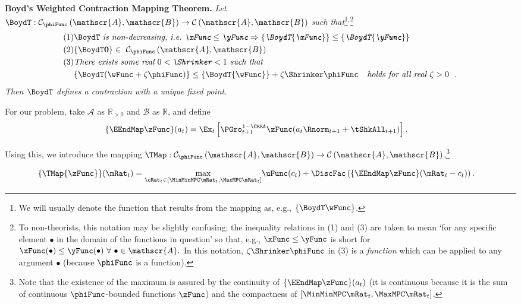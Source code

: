\documentclass[BufferStockTheory]{subfiles}
\begin{document}
\textbf{Boyd's Weighted Contraction Mapping Theorem.} \textit{Let $\BoydT:\mathcal{C}_{\phiFunc }\left( \mathscr{A},\mathscr{B}\right)
  \rightarrow \mathcal{C}\left( \mathscr{A},\mathscr{B}\right) $ such
  that}\footnote{We will usually denote the function that results from the mapping as, e.g., $\{\BoydT\wFunc\}$.}$^,$\footnote{To non-theorists, this notation may be slightly confusing; the inequality relations in (1) and (3) are taken to mean `for any specific element $\bullet$ in the domain of the functions in question' so that, e.g., $\xFunc \leq \yFunc$ is short for $\xFunc(\bullet) \leq \yFunc(\bullet)~\forall~\bullet\in \mathscr{A}.$  In this notation, $\zeta \Shrinker \phiFunc$ in (3) is a \textit{function} which can be applied to any argument $\bullet$ (because $\phiFunc$ is a function).} \nopagebreak
\begin{align*}
  \mbox{(1)} &\BoydT%
               \mbox{ \textit{is non-decreasing, i.e.\ ${\xFunc} \leq {\yFunc}\Rightarrow
               \{\BoydT{\xFunc}\} \leq \{\BoydT{\yFunc}\}$}}   \nonumber \\
  \mbox{(2)} & \{\BoydT\mathbf{0}\}\in ~ \mathcal{C}_{\phiFunc }\left(\mathscr{A},\mathscr{B}\right)  \notag \\
  \mbox{(3)}
             & \mbox{\textit{There exists some real $0 < \Shrinker < 1$ such that}} \\
             & \{\BoydT({\wFunc} +\zeta\phiFunc )\} \leq \{\BoydT{\wFunc}\} +\zeta\Shrinker \phiFunc 
               \mbox{ \textit{ ~holds for all real $\zeta > 0$ } } .
\end{align*}
\textit{Then $\BoydT$ defines a contraction with a unique fixed point.}

For our problem, take $\mathscr{A}$ as $\mathbb{R}_{>0}$ and $\mathscr{B}$
as $\mathbb{R}$, and define
\begin{align*}
  \{\EEndMap \zFunc\}(a_{t})  & = \Ex_{t}\left[\PGro^{1-\CRRA}_{t+1} \zFunc(a_{t} \Rnorm_{t+1} + \tShkAll_{t+1})\right].
\end{align*}

Using this, we introduce the mapping \textit{$\TMap:\mathcal{C}_{\phiFunc }\left( \mathscr{A},\mathscr{B}\right) \rightarrow \mathcal{C}\left(
    \mathscr{A},\mathscr{B}\right) $},\footnote{Note that the existence of the maximum is assured by the continuity of $\{\EEndMap \zFunc\}(a_{t})$ (it is continuous because it is the sum of continuous $\phiFunc$-bounded functions $\zFunc$) and the compactness of $[\MinMinMPC \mRat_{t},  \MaxMPC \mRat_{t}]$.}
\begin{comment} %
  (In the subtle case when $\MinMinMPC=0$, the compact interval could be revised as $ [(\MinMinMPC+\epsilon) \mRat_{t},
  \MaxMPC \mRat_{t}]$ where $\epsilon$ is a very small positive number because obviously $\MinMinMPC \mRat_{t}=0$ will not be the $\argmax$)
\end{comment}
\begin{align}
  \{\TMap{\zFunc}\}(\mRat_{t})  & = \underset{{\cRat}_{t} \in
                                  [\MinMinMPC \mRat_{t}, \MaxMPC \mRat_{t}]
                                  } \max
                                  \uFunc(c_{t})+\DiscFac \left( \{\EEndMap \zFunc \}(\mRat_{t}-c_{t}) \right)  \label{definitionmappingT}.
\end{align}
\end{document}
